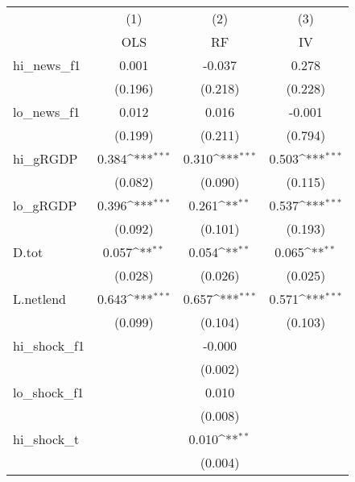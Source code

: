 {
\def\sym#1{\ifmmode^{#1}\else\(^{#1}\)\fi}
\begin{tabular}{l*{3}{c}}
\toprule
            &\multicolumn{1}{c}{(1)}&\multicolumn{1}{c}{(2)}&\multicolumn{1}{c}{(3)}\\
            &\multicolumn{1}{c}{OLS}&\multicolumn{1}{c}{RF}&\multicolumn{1}{c}{IV}\\
\midrule
hi\_news\_f1  &       0.001         &      -0.037         &       0.278         \\
            &     (0.196)         &     (0.218)         &     (0.228)         \\
\addlinespace
lo\_news\_f1  &       0.012         &       0.016         &      -0.001         \\
            &     (0.199)         &     (0.211)         &     (0.794)         \\
\addlinespace
hi\_gRGDP    &       0.384\sym{***}&       0.310\sym{***}&       0.503\sym{***}\\
            &     (0.082)         &     (0.090)         &     (0.115)         \\
\addlinespace
lo\_gRGDP    &       0.396\sym{***}&       0.261\sym{**} &       0.537\sym{***}\\
            &     (0.092)         &     (0.101)         &     (0.193)         \\
\addlinespace
D.tot       &       0.057\sym{**} &       0.054\sym{**} &       0.065\sym{**} \\
            &     (0.028)         &     (0.026)         &     (0.025)         \\
\addlinespace
L.netlend   &       0.643\sym{***}&       0.657\sym{***}&       0.571\sym{***}\\
            &     (0.099)         &     (0.104)         &     (0.103)         \\
\addlinespace
hi\_shock\_f1 &                     &      -0.000         &                     \\
            &                     &     (0.002)         &                     \\
\addlinespace
lo\_shock\_f1 &                     &       0.010         &                     \\
            &                     &     (0.008)         &                     \\
\addlinespace
hi\_shock\_t  &                     &       0.010\sym{**} &                     \\
            &                     &     (0.004)         &                     \\

\end{tabular}}
